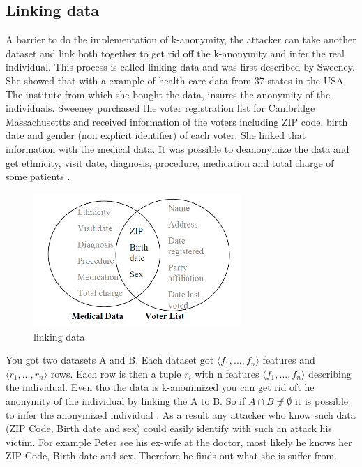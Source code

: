\documentclass{llncs}
\begin{document}

\subsection{Linking data}
A barrier to do the implementation of k-anonymity, the attacker can take another dataset and link both together to get rid off the k-anonymity and infer the real individual. This process is called linking data and was first described by Sweeney\cite{sweeney2002k}. She showed that with a example of health care data from 37 states in the USA. The institute from which she bought the data, insures the anonymity of the individuals. Sweeney purchased the voter registration list for Cambridge Massachusettts and received information of the voters including ZIP code, birth date and gender (non explicit identifier) of each voter. She linked that information with the medical data. It was possible to deanonymize the data  and get ethnicity, visit date, diagnosis, procedure, medication and total charge of some patients \cite{sweeney2002k}. 

\begin{figure}[]
	\centering
	\includegraphics[width=0.7\textwidth]{linkingdata.png}
	\caption{linking data}%
	\label{quasiidentifier}
\end{figure}
You got two datasets A and B. Each dataset got \ensuremath{\langle f_1, ... ,f_n \rangle} features and \ensuremath{\langle r_1, ... ,r_n \rangle} rows.
Each row is then a tuple \ensuremath{r_i} with n features \ensuremath{\langle f_1, ... ,f_n \rangle} describing the individual.
Even tho the data is k-anonimized you can get rid oft he anonymity of the individual by linking the A to B. So if \ensuremath{A \cap B \not \neq \emptyset} it is possible to infer the anonymized individual \cite{sweeney2002k}.
As a result any attacker who know such data (ZIP Code, Birth date and sex) could easily identify with such an attack his victim. For example Peter see his ex-wife at the doctor, most likely he knows her ZIP-Code, Birth date and sex. Therefore he finds out what she is suffer from. 
\end{document}
